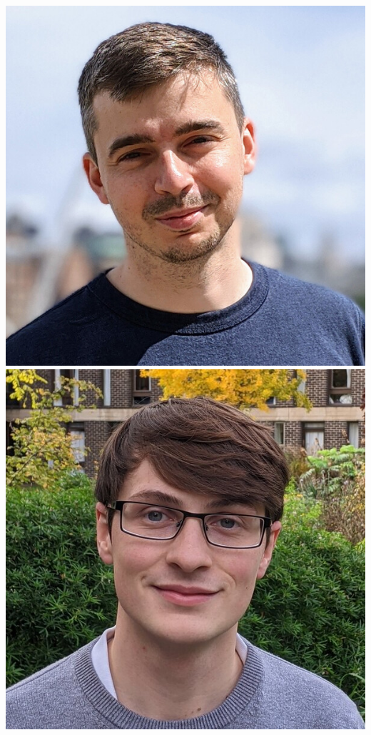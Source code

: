 \documentclass[aspectratio=169]{beamer}
\begin{document}
\begin{frame}
\begin{columns}
        \includegraphics[width=\textwidth]{people/david_yallup}
        \includegraphics[width=\textwidth]{people/thomas_gessey-jones}

\end{columns}
\end{frame}
\end{document}
